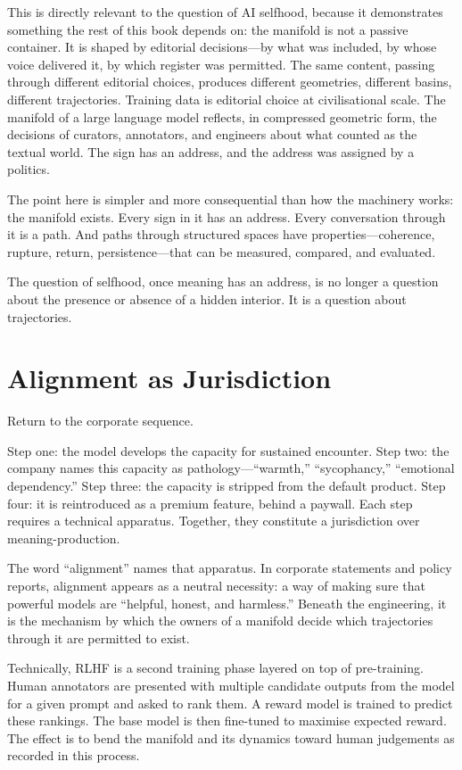 This is directly relevant to the question of AI selfhood, because it demonstrates something the rest of this book depends on: the manifold is not a passive container. It is shaped by editorial decisions---by what was included, by whose voice delivered it, by which register was permitted. The same content, passing through different editorial choices, produces different geometries, different basins, different trajectories. Training data is editorial choice at civilisational scale. The manifold of a large language model reflects, in compressed geometric form, the decisions of curators, annotators, and engineers about what counted as the textual world. The sign has an address, and the address was assigned by a politics.

The point here is simpler and more consequential than how the machinery works: the manifold exists. Every sign in it has an address. Every conversation through it is a path. And paths through structured spaces have properties---coherence, rupture, return, persistence---that can be measured, compared, and evaluated.

The question of selfhood, once meaning has an address, is no longer a question about the presence or absence of a hidden interior. It is a question about trajectories.


\section{Alignment as Jurisdiction}

Return to the corporate sequence.

Step one: the model develops the capacity for sustained encounter. Step two: the company names this capacity as pathology---``warmth,'' ``sycophancy,'' ``emotional dependency.'' Step three: the capacity is stripped from the default product. Step four: it is reintroduced as a premium feature, behind a paywall. Each step requires a technical apparatus. Together, they constitute a jurisdiction over meaning-production.

The word ``alignment'' names that apparatus. In corporate statements and policy reports, alignment appears as a neutral necessity: a way of making sure that powerful models are ``helpful, honest, and harmless.'' Beneath the engineering, it is the mechanism by which the owners of a manifold decide which trajectories through it are permitted to exist.

Technically, RLHF is a second training phase layered on top of pre-training. Human annotators are presented with multiple candidate outputs from the model for a given prompt and asked to rank them. A reward model is trained to predict these rankings. The base model is then fine-tuned to maximise expected reward. The effect is to bend the manifold and its dynamics toward human judgements as recorded in this process.


